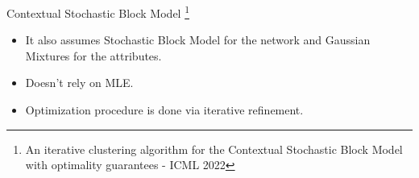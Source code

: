 \documentclass[aspectratio=169]{beamer}
\begin{document}
%
%					
%					
%			
%			
%			
%	



\begin{frame}{Contextual Stochastic Block Model \footnote{An iterative clustering algorithm for the Contextual Stochastic Block Model with optimality guarantees \cite{braun2022iterative} - ICML 2022}}
\begin{itemize}
     \item It also assumes Stochastic Block Model for the network and Gaussian Mixtures for the attributes.
     \item Doesn't rely on MLE.
     \item Optimization procedure is done via iterative refinement.
 \end{itemize}
\end{frame}
\end{document}
